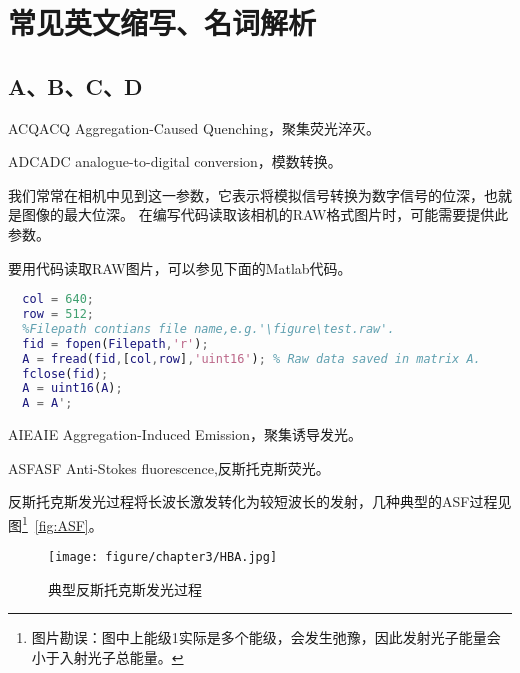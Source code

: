 \documentclass[cn,11pt,chinese]{elegantbook}
\begin{document}
\chapter{常见英文缩写、名词解析}
\section{A、B、C、D}

\begin{theorem}{ACQ}{ACQ}
  Aggregation-Caused Quenching，聚集荧光淬灭。
\end{theorem}

\begin{theorem}{ADC}{ADC}
  analogue-to-digital conversion，模数转换。
  
  我们常常在相机中见到这一参数，它表示将模拟信号转换为数字信号的位深，也就是图像的最大位深。
  在编写代码读取该相机的RAW格式图片时，可能需要提供此参数。

  要用代码读取RAW图片，可以参见下面的Matlab代码。
\end{theorem}
\begin{lstlisting}[language=Matlab]
  % matlab code:open a RAW file
  col = 640;
  row = 512;
  %Filepath contians file name,e.g.'\figure\test.raw'.
  fid = fopen(Filepath,'r'); 
  A = fread(fid,[col,row],'uint16'); % Raw data saved in matrix A.
  fclose(fid);
  A = uint16(A);
  A = A';
\end{lstlisting}

\begin{theorem}{AIE}{AIE}
  Aggregation-Induced Emission，聚集诱导发光。
\end{theorem}

\begin{theorem}{ASF}{ASF}
  Anti-Stokes fluorescence,反斯托克斯荧光。

  反斯托克斯发光过程将长波长激发转化为较短波长的发射，几种典型的ASF过程见图\footnote{图片勘误：图中上能级1实际是多个能级，会发生弛豫，因此发射光子能量会小于入射光子总能量。}~\vref{fig:ASF}。
\end{theorem}

\begin{figure}[ht]
  \centering
  \texttt{[image: figure/chapter3/HBA.jpg]}
  \caption{典型反斯托克斯发光过程}
  \label{fig:ASF}
\end{figure}
\end{document}
